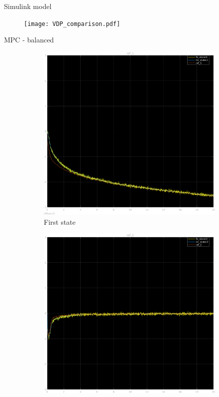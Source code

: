 \documentclass{beamer}
\begin{document}
\begin{frame}{Simulink model}
    \begin{figure}
        \centering
        \texttt{[image: VDP\_comparison.pdf]}
    \end{figure}
\end{frame}

\begin{frame}{MPC - balanced}
    \begin{figure}
        \centering
        \begin{subfigure}[b]{0.45\textwidth}
            \centering
            \includegraphics[width=\textwidth]{balanced_mpc_1.png}
            \caption{First state}
        \end{subfigure}
        \hfill
        \begin{subfigure}[b]{0.45\textwidth}
            \centering
            \includegraphics[width=\textwidth]{balanced_mpc_2.png}

\end{subfigure}
\end{figure}
\end{frame}
\end{document}

